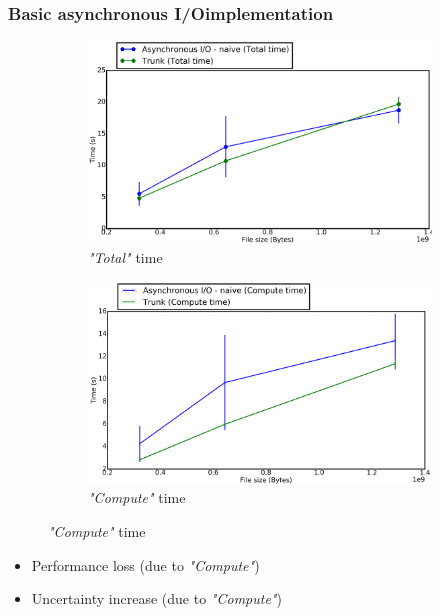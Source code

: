 \documentclass[slidestop,xcolor=dvipsnames, notes=hide]{beamer}
\newcommand{\notationIO}					{I/O}
\newcommand{\notationaio}					{asynchronous \notationIO}
\begin{document}
		\begin{frame}
			\frametitle{Basic \notationaio\space implementation}
			\begin{figure}[!h]
				\centering
				\begin{subfigure}[b]{0.49\textwidth}
					\centering
					\includegraphics[width=\textwidth]{images/cubeRemapper_basicImplementation_total_hpc.png}
					\caption[\emph{"Total"} time]%
					{{\small \emph{"Total"} time}}
				\end{subfigure}
				\hfill
				\begin{subfigure}[b]{0.49\textwidth}
					\centering
					\includegraphics[width=\textwidth]{images/cubeRemapper_basicImplementation_compute_hpc.png}
					\caption[]%
					{{\small \emph{"Compute"} time}}
				\end{subfigure}
			\end{figure}

			\pause
			\begin{block}{}
			\begin{itemize}
				\item Performance loss (due to \emph{"Compute"})
				\item Uncertainty increase (due to \emph{"Compute"})
			\end{itemize}
			\end{block}
		\end{frame}
\end{document}
